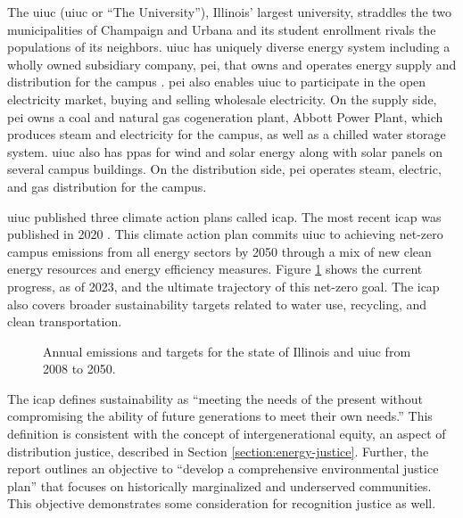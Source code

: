 The \acl{uiuc} (\acs{uiuc} or ``The University''), Illinois' largest university,
straddles the two municipalities of Champaign and Urbana and its student
enrollment rivals the populations of its neighbors. \ac{uiuc} has uniquely
diverse energy system including a wholly owned subsidiary company, \ac{pei},
that owns and operates energy supply and distribution for the campus
\cite{affiliated_engineers_inc_utilities_2015}. \ac{pei} also enables \ac{uiuc}
to participate in the open electricity market, buying and selling wholesale
electricity. On the supply side, \ac{pei} owns a coal and natural gas
cogeneration plant, Abbott Power Plant, which produces steam and electricity for
the campus, as well as a chilled water storage system. \ac{uiuc} also has
\acp{ppa} for wind \cite{breitweiser_wind_2016} and solar energy
\cite{white_solar_2017, white_solar_2020} along with solar panels on several
campus buildings. On the distribution side, \ac{pei} operates steam, electric,
and gas distribution for the campus. 

\ac{uiuc} published three climate action plans called \ac{icap}. The most recent
\ac{icap} was published in 2020
\cite{institute_for_sustainability_energy_and_environment_illinois_2020}. This
climate action plan commits \ac{uiuc} to achieving net-zero campus emissions
from all energy sectors by 2050 through a mix of new clean energy resources and
energy efficiency measures. Figure \ref{fig:uiuc-emissions} shows the current
progress, as of 2023, and the ultimate trajectory of this net-zero goal. The
\ac{icap} also covers broader sustainability targets related to water use,
recycling, and clean transportation. 
\begin{figure}[ht!]
    \centering
    \resizebox{0.75\columnwidth}{!}{}
    \caption{Annual emissions and targets for the state of Illinois and
    \ac{uiuc} from 2008 to 2050.}
    \label{fig:uiuc-emissions}
\end{figure}
The \ac{icap} defines sustainability as ``meeting the needs of the present
without compromising the ability of future generations to meet their own
needs.'' This definition is consistent with the concept of intergenerational
equity, an aspect of distribution justice, described in Section
\ref{section:energy-justice}. Further, the report outlines an objective to
``develop a comprehensive environmental justice plan'' that focuses on
historically marginalized and underserved communities. This objective
demonstrates some consideration for recognition justice as well.

